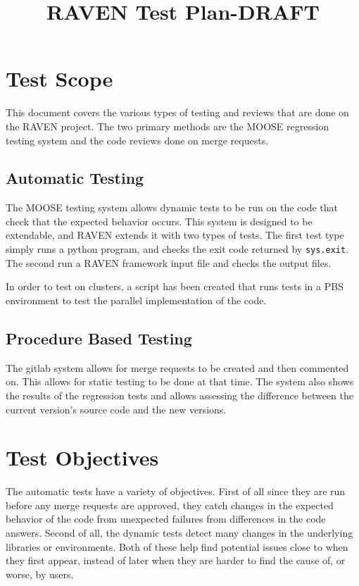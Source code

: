 \documentclass{article}
\title{RAVEN Test Plan-DRAFT}
\begin{document}
\maketitle

\section{Test Scope}

This document covers the various types of testing and reviews that are
done on the RAVEN project. The two primary methods are the MOOSE
regression testing system and the code reviews done on merge requests.

\subsection{Automatic Testing}

The MOOSE testing system allows dynamic tests to be run on the code
that check that the expected behavior occurs.  This system is designed
to be extendable, and RAVEN extends it with two types of tests.  The
first test type simply runs a python program, and checks the exit code
returned by \verb'sys.exit'.  The second run a RAVEN framework input
file and checks the output files.

In order to test on clusters, a script has been created that runs
tests in a PBS environment to test the parallel implementation of the
code.

\subsection{Procedure Based Testing}

The gitlab system allows for merge requests to be created and then
commented on.  This allows for static testing to be done at that time.
The system also shows the results of the regression tests and allows
assessing the difference between the current version's source code and
the new versions.

\section{Test Objectives}

The automatic tests have a variety of objectives.  First of all since
they are run before any merge requests are approved, they catch
changes in the expected behavior of the code from unexpected failures
from differences in the code answers.  Second of all, the dynamic
tests detect many changes in the underlying libraries or environments.
Both of these help find potential issues close to when they first
appear, instead of later when they are harder to find the cause of, or
worse, by users.
\end{document}
